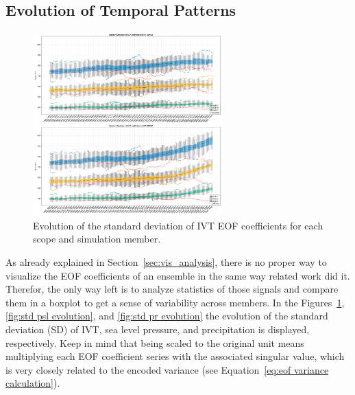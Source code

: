 \subsection{Evolution of Temporal Patterns}

\begin{figure}[htb]
  \begin{center}
    \includegraphics[width=0.65\textwidth]{figures/std_ivt_50seasons_tempmodescale_3modes.png}
  \end{center}
  \caption{Evolution of the standard deviation of IVT EOF coefficients for each scope and simulation member.}
  \label{fig:std ivt evolution}
\end{figure}

As already explained in Section~\ref{sec:vis_analysis}, there is no proper way to visualize the EOF coefficients of an ensemble in the same way related work did it. 
Therefor, the only way left is to analyze statistics of those signals and compare them in a boxplot to get a sense of variability across members. 
In the Figures~\ref{fig:std ivt evolution}, \ref{fig:std psl evolution}, and \ref{fig:std pr evolution} the evolution of the standard deviation (SD) of IVT, sea level pressure, and precipitation is displayed, respectively. 
Keep in mind that being scaled to the original unit means multiplying each EOF coefficient series with the associated singular value, which is very closely related to the encoded variance (see Equation~\ref{eq:eof variance calculation}). 


